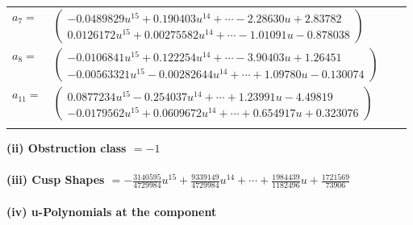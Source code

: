\documentclass[1p]{elsarticle_modified}
\theoremstyle{definition}
\begin{document}
\begin{tabular}{m{7pt} m{180pt} m{7pt} m{180pt} }
\flushright $a_{7}=$&$\begin{pmatrix}-0.0489829 u^{15}+0.190403 u^{14}+\cdots-2.28630 u+2.83782\\0.0126172 u^{15}+0.00275582 u^{14}+\cdots-1.01091 u-0.878038\end{pmatrix}$ \\
\flushright $a_{8}=$&$\begin{pmatrix}-0.0106841 u^{15}+0.122254 u^{14}+\cdots-3.90403 u+1.26451\\-0.00563321 u^{15}-0.00282644 u^{14}+\cdots+1.09780 u-0.130074\end{pmatrix}$ \\
\flushright $a_{11}=$&$\begin{pmatrix}0.0877234 u^{15}-0.254037 u^{14}+\cdots+1.23991 u-4.49819\\-0.0179562 u^{15}+0.0609672 u^{14}+\cdots+0.654917 u+0.323076\end{pmatrix}$\\&\end{tabular}
\flushleft \textbf{(ii) Obstruction class $= -1$}\\~\\
\flushleft \textbf{(iii) Cusp Shapes $= -\frac{3140595}{4729984} u^{15}+\frac{9339149}{4729984} u^{14}+\cdots+\frac{1984439}{1182496} u+\frac{1721569}{73906}$}\\~\\
\newpage\renewcommand{\arraystretch}{1}
\flushleft \textbf{(iv) u-Polynomials at the component}\newline \\
\end{document}

